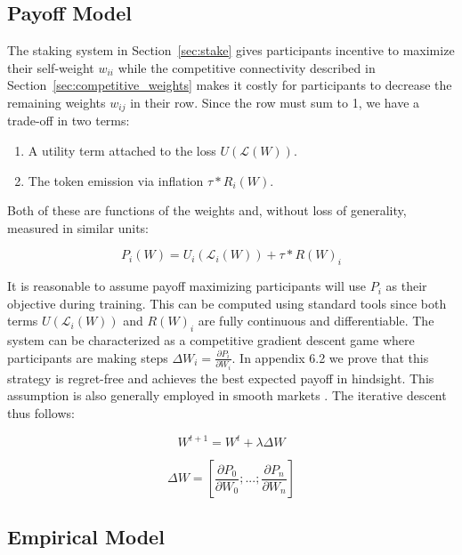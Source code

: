 \documentclass{article}
\begin{document}
\subsection{Payoff Model}

The staking system in Section~\ref{sec:stake} gives participants incentive to maximize their self-weight $w_{ii}$ while the competitive connectivity described in Section~\ref{sec:competitive_weights} makes it costly for participants to decrease the remaining weights $w_{ij}$ in their row. Since the row must sum to 1, we have a trade-off in two terms:

\begin{enumerate}
	\item A utility term attached to the loss $U(\mathcal{L}(W))$.
	\item The token emission via inflation $\tau * R_i(W)$. 
\end{enumerate}

Both of these are functions of the weights and, without loss of generality, measured in similar units:

\begin{equation}
P_i (W) = U_i(\mathcal{L}_i(W)) + \tau * R(W)_i
\end{equation}

It is reasonable to assume payoff maximizing participants will use $P_i$ as their objective during training. This can be computed using standard tools since both terms $U(\mathcal{L}_i(W))$ and $R(W)_i$ are fully continuous and differentiable. The system can be characterized as a competitive gradient descent game where participants are making steps $\Delta W_i = \frac{\partial P_i}{\partial W_i}$. In appendix 6.2 we prove that this strategy is regret-free and achieves the best expected payoff in hindsight. This assumption is also generally employed in smooth markets \cite{balduzzi2020smooth}. The iterative descent thus follows:


\begin{equation}
W^{t+1} = W^{t} + \lambda \Delta W 
\end{equation}

\begin{equation}
\label{eq:grad_step2}
\Delta W = [\frac{\partial P_0}{\partial W_0} ; ... ;\frac{\partial P_n}{\partial W_n}]
\end{equation}

\subsection{Empirical Model}
\end{document}
